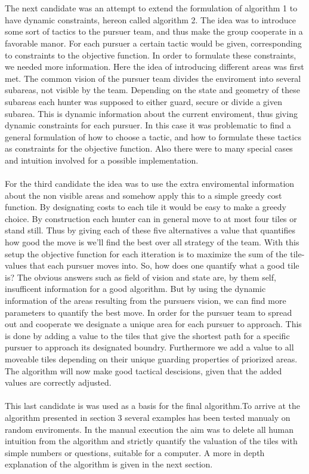 \\
\\The next candidate was an attempt to extend the formulation of algorithm 1 to have dynamic constraints, hereon called algorithm 2. The idea was to introduce some sort of tactics to the pursuer team, and thus make the group cooperate in a favorable manor. For each pursuer a certain tactic would be given, corresponding to constraints to the objective function. In order to formulate these constraints, we needed more information. Here the idea of introducing different areas was first met. The common vision of the pursuer team divides the enviroment into several subareas, not visible by the team. Depending on the state and geometry of these subareas each hunter was supposed to either guard, secure or divide a given subarea. This is dynamic information about the current enviroment, thus giving dynamic constraints for each pursuer. In this case it was problematic to find a general formulation of how to choose a tactic, and how to formulate these tactics as constraints for the objective function. Also there were to many special cases and intuition involved for a possible implementation.
\\%
\\For the third candidate the idea was to use the extra enviromental information about the non visible areas and somehow apply this to a simple greedy cost function. By designating costs to each tile it would be easy to make a greedy choice. By construction each hunter can in general move to at most four tiles or stand still. Thus by giving each of these five alternatives a value that quantifies how good the move is we'll find the best over all strategy of the team. With this setup the objective function for each itteration is to maximize the sum of the tile-values that each pursuer moves into. So, how does one quantify what  a good tile is? The obvious answers such as field of vision and state are, by them self, insufficent information for a good algorithm. But by using the dynamic information of the areas resulting from the pursuers vision, we can find more parameters to quantify the best move. In order for the pursuer team to spread out and cooperate we designate a unique area for each pursuer to approach. This is done by adding a value to the tiles that give the shortest path for a specific pursuer to approach its designated boundry. Furthermore we add a value to all moveable tiles depending on their unique guarding properties of priorized areas. The algorithm will now make good tactical descisions, given that the added values are correctly adjusted. 
\\
\\This last candidate is was used as a basis for the final algorithm.To arrive at the algorithm presented in section 3 several examples has been tested manualy on random enviroments. In the manual execution the aim was to delete all human intuition from the algorithm and strictly quantify the valuation of the tiles with simple numbers or questions, suitable for a computer. A more in depth explanation of the algorithm is given in the next section.

